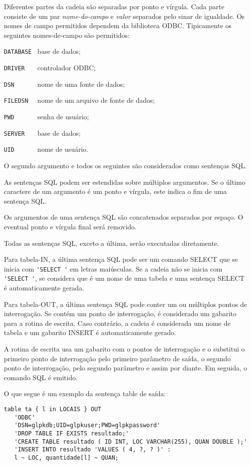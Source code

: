 \documentclass[11pt, brazil]{report}
\begin{document}
Diferentes partes da cadeia são separadas por ponto e vírgula. Cada parte
consiste de um par {\it nome-do-campo} e {\it valor} separados pelo sinar
de igualdade. Os nomes de campo permitidos dependem da biblioteca ODBC.
Tipicamente os seguintes nomes-de-campo são permitidos:

\verb|DATABASE | base de dados;

\verb|DRIVER   | controlador ODBC;

\verb|DSN      | nome de uma fonte de dados;

\verb|FILEDSN  | nome de um arquivo de fonte de dados;

\verb|PWD      | senha de usuário;

\verb|SERVER   | base de dados;

\verb|UID      | nome de usuário.

O segundo argumento e todos os seguintes são considerados como
sentenças SQL.

As sentenças SQL podem ser estendidas sobre múltiplos argumentos.  Se o
último caractere de um argumento é um ponto e vírgula, este indica
o fim de uma sentença SQL.

Os argumentos de uma sentença SQL são concatenados separados por espaço.
O eventual ponto e vírgula final será removido.

Todas as sentenças SQL, exceto a última, serão executadas diretamente.

Para tabela-IN, a última sentença SQL pode ser um comando SELECT que se inicia
com \verb|'SELECT '| em letras maiúsculas. Se a cadeia não se inicia com
\verb|'SELECT '|, se considera que é um nome de uma tabela e uma sentença
SELECT é automaticamente gerada.


Para tabela-OUT, a última sentença SQL pode conter um ou múltiplos pontos de
interrogação. Se contém um ponto de interrogação, é considerado um gabarito
para a rotina de escrita. Caso contrário, a cadeia é considerada um
nome de tabela e um gabarito INSERT é automaticamente gerado.

A rotina de escrita usa um gabarito com o pontos de interrogação e
o substitui o primeiro ponto de interrogação pelo primeiro parâmetro
de saída, o segundo ponto de interrogação, pelo segundo parâmetro e
assim por diante. Em seguida, o comando SQL é emitido.

O que segue é um exemplo da sentença table de saída:

\begin{verbatim}
table ta { l in LOCAIS } OUT
   'ODBC'
   'DSN=glpkdb;UID=glpkuser;PWD=glpkpassword'
   'DROP TABLE IF EXISTS resultado;'
   'CREATE TABLE resultado ( ID INT, LOC VARCHAR(255), QUAN DOUBLE );'
   'INSERT INTO resultado 'VALUES ( 4, ?, ? )' :
   l ~ LOC, quantidade[l] ~ QUAN;
\end{verbatim}
\end{document}
